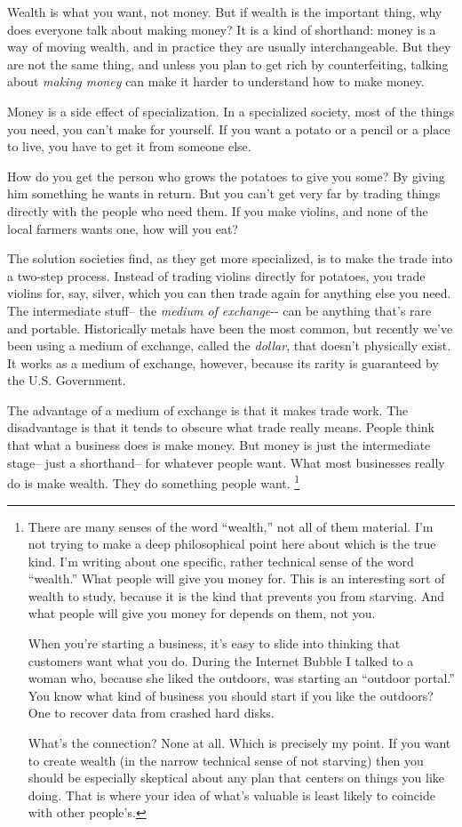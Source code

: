 Wealth is what you want, not money. But if wealth is the important
thing, why does everyone talk about making money? It is a kind of
shorthand: money is a way of moving wealth, and in practice they are
usually interchangeable. But they are not the same thing, and unless you
plan to get rich by counterfeiting, talking about \emph{making money}
can make it harder to understand how to make money.

Money is a side effect of specialization. In a specialized society, most
of the things you need, you can't make for yourself. If you want a
potato or a pencil or a place to live, you have to get it from someone
else.

How do you get the person who grows the potatoes to give you some? By
giving him something he wants in return. But you can't get very far by
trading things directly with the people who need them. If you make
violins, and none of the local farmers wants one, how will you eat?

The solution societies find, as they get more specialized, is to make
the trade into a two-step process. Instead of trading violins directly
for potatoes, you trade violins for, say, silver, which you can then
trade again for anything else you need. The intermediate stuff-- the
\emph{medium of exchange}-\/- can be anything that's rare and portable.
Historically metals have been the most common, but recently we've been
using a medium of exchange, called the \emph{dollar}, that doesn't
physically exist. It works as a medium of exchange, however, because its
rarity is guaranteed by the U.S. Government.

The advantage of a medium of exchange is that it makes trade work. The
disadvantage is that it tends to obscure what trade really means. People
think that what a business does is make money. But money is just the
intermediate stage-- just a shorthand-- for whatever people want. What
most businesses really do is make wealth. They do something people want.
\footnote{There are many senses of the word ``wealth,'' not all of them
material. I'm not trying to make a deep philosophical point here about
which is the true kind. I'm writing about one specific, rather technical
sense of the word ``wealth.'' What people will give you money for. This
is an interesting sort of wealth to study, because it is the kind that
prevents you from starving. And what people will give you money for
depends on them, not you.

When you're starting a business, it's easy to slide into thinking that
customers want what you do. During the Internet Bubble I talked to a
woman who, because she liked the outdoors, was starting an ``outdoor
portal.'' You know what kind of business you should start if you like
the outdoors? One to recover data from crashed hard disks.

What's the connection? None at all. Which is precisely my point. If you
want to create wealth (in the narrow technical sense of not starving)
then you should be especially skeptical about any plan that centers on
things you like doing. That is where your idea of what's valuable is
least likely to coincide with other people's.}

